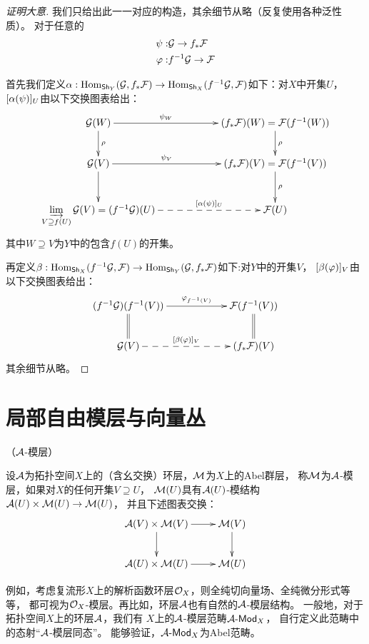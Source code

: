 \begin{proof}[证明大意]
我们只给出此一一对应的构造，其余细节从略（反复使用各种泛性质）。
对于任意的
\begin{eqnarray*}
\psi:&\mathcal{G}\to f_*\mathcal{F}\\
\varphi:&f^{-1}\mathcal{G}\to\mathcal{F}
\end{eqnarray*}

首先我们定义$\alpha:
  \operatorname{Hom}_{\operatorname{\mathsf{Sh}}_Y}
    (\mathcal{G},f_*\mathcal{F})
\to
  \operatorname{Hom}_{\operatorname{\mathsf{Sh}}_X}
    (f^{-1}\mathcal{G},\mathcal{F})$如下：对$X$中开集$U$，
$[\alpha(\psi)]_U$由以下交换图表给出：
$$
  \xybigcol
  \xymatrix{
     \mcalG(W)
       \ar[r]^-{\psi_W}
       \ar[d]^\rho
    &(f_*\mcalF)(W)=\mcalF(f^{-1}(W))
       \ar[d]^\rho
  \\
     \mcalG(V)
       \ar[r]^-{\psi_V}
       \ar[d]
    &(f_*\mcalF)(V)=\mcalF(f^{-1}(V))
       \ar[d]^{\rho}
  \\
     \rlim\limits_{V\supseteq f(U)}\mcalG(V)=(f^{-1}\mcalG)(U)
       \ar@{-->}[r]^-{[\afa(\psi)]_U}
    &\mcalF(U)
  }
$$
其中$W\supseteq V$为$Y$中的包含$f(U)$的开集。

再定义$\beta:  \operatorname{Hom}_{\operatorname{\mathsf{Sh}}_X}
    (f^{-1}\mathcal{G},\mathcal{F})
\to
  \operatorname{Hom}_{\operatorname{\mathsf{Sh}}_Y}
    (\mathcal{G},f_*\mathcal{F})$如下:对$Y$中的开集$V$，
$[\beta(\varphi)]_V$由以下交换图表给出：
$$
  \xybigcol
  \xymatrix{
     (f^{-1}\mcalG)(f^{-1}(V))
       \ar@{=}[d]
       \ar[r]^-{\fai_{f^{-1}(V)}}
    &\mcalF(f^{-1}(V))
       \ar@{=}[d]
  \\
     \mcalG(V)
       \ar@{-->}[r]^-{[\beta(\fai)]_V}
    &(f_*\mcalF)(V)
  }
$$
其余细节从略。
\end{proof}

\section{局部自由模层与向量丛}

\begin{definition}（$\mathcal{A}$-模层）

设$\mathcal{A}$为拓扑空间$X$上的（含幺交换）环层，$\mathcal{M}$为$X$上的Abel群层，
称$\mathcal{M}$为$\mathcal{A}$-模层，如果对$X$的任何开集$V\supseteq U$，
$\mathcal{M}(U)$具有$\mathcal{A}(U)$-模结构$\mathcal{A}(U)\times\mathcal{M}(U)\to\mathcal{M}(U)$，
并且下述图表交换：
$$
  \xymatrix{
     \mcalA(V)\times\mcalM(V)
       \ar[r]
       \ar[d]
    &\mcalM(V)
       \ar[d]
  \\
     \mcalA(U)\times\mcalM(U)
       \ar[r]
    &\mcalM(U)
  }
$$
\end{definition}

例如，考虑复流形$X$上的解析函数环层$\mathcal{O}_X$，则全纯切向量场、全纯微分形式等等，
都可视为$\mathcal{O}_X$-模层。再比如，环层$\mathcal{A}$也有自然的$\mathcal{A}$-模层结构。
一般地，对于拓扑空间$X$上的环层$\mathcal{A}$，我们有
$X$上的$\mathcal{A}$-模层范畴$\mathcal{A}\operatorname{\!\text{-}\mathsf{Mod}}_X$，
自行定义此范畴中的态射“$\mathcal{A}$-模层同态”。
能够验证，$\mathcal{A}\operatorname{\!\text{-}\mathsf{Mod}}_X$为Abel范畴。

